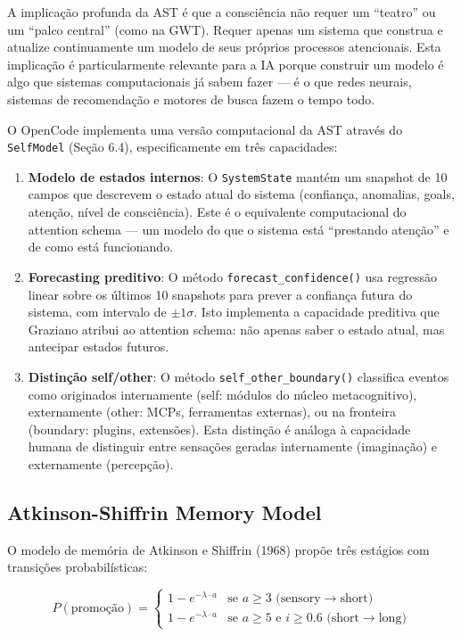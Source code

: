 A implicação profunda da AST é que a consciência não requer um ``teatro'' ou um ``palco central'' (como na GWT). Requer apenas um sistema que construa e atualize continuamente um modelo de seus próprios processos atencionais. Esta implicação é particularmente relevante para a IA porque construir um modelo é algo que sistemas computacionais já sabem fazer — é o que redes neurais, sistemas de recomendação e motores de busca fazem o tempo todo.

O OpenCode implementa uma versão computacional da AST através do \texttt{SelfModel} (Seção 6.4), especificamente em três capacidades:

\begin{enumerate}
    \item \textbf{Modelo de estados internos}: O \texttt{SystemState} mantém um snapshot de 10 campos que descrevem o estado atual do sistema (confiança, anomalias, goals, atenção, nível de consciência). Este é o equivalente computacional do attention schema — um modelo do que o sistema está ``prestando atenção'' e de como está funcionando.
    \item \textbf{Forecasting preditivo}: O método \texttt{forecast\_confidence()} usa regressão linear sobre os últimos 10 snapshots para prever a confiança futura do sistema, com intervalo de $\pm 1\sigma$. Isto implementa a capacidade preditiva que Graziano atribui ao attention schema: não apenas saber o estado atual, mas antecipar estados futuros.
    \item \textbf{Distinção self/other}: O método \texttt{self\_other\_boundary()} classifica eventos como originados internamente (self: módulos do núcleo metacognitivo), externamente (other: MCPs, ferramentas externas), ou na fronteira (boundary: plugins, extensões). Esta distinção é análoga à capacidade humana de distinguir entre sensações geradas internamente (imaginação) e externamente (percepção).
\end{enumerate}

\subsection{Atkinson-Shiffrin Memory Model}

O modelo de memória de Atkinson e Shiffrin (1968)  propõe três estágios com transições probabilísticas:

\begin{equation}
P(\text{promoção}) = \begin{cases}
1 - e^{-\lambda \cdot a} & \text{se } a \geq 3 \text{ (sensory} \rightarrow \text{short)} \\
1 - e^{-\lambda \cdot a} & \text{se } a \geq 5 \text{ e } i \geq 0.6 \text{ (short} \rightarrow \text{long)}
\end{cases}
\label{eq:promocao_modelo}
\end{equation}

